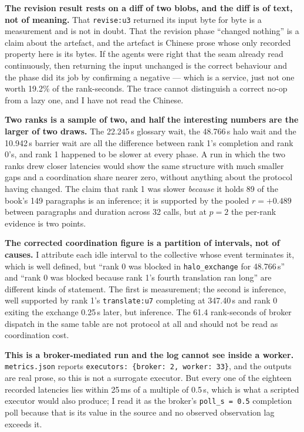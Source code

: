 \documentclass[11pt]{article}
\begin{document}
\textbf{The revision result rests on a diff of two blobs, and the diff is of text, not of
meaning.} That \texttt{revise:u3} returned its input byte for byte is a measurement and is not in
doubt. That the revision phase ``changed nothing'' is a claim about the artefact, and the artefact
is Chinese prose whose only recorded property here is its bytes. If the agents were right that
the seam already read continuously, then returning the input unchanged is the correct behaviour
and the phase did its job by confirming a negative --- which is a service, just not one worth
19.2\% of the rank-seconds. The trace cannot distinguish a correct no-op from a lazy one, and I
have not read the Chinese.

\textbf{Two ranks is a sample of two, and half the interesting numbers are the larger of two
draws.} The 22.245\,s glossary wait, the 48.766\,s halo wait and the 10.942\,s barrier wait are
all the difference between rank 1's completion and rank 0's, and rank 1 happened to be slower at
every phase. A run in which the two ranks drew closer latencies would show the same structure with
much smaller gaps and a coordination share nearer zero, without anything about the protocol having
changed. The claim that rank 1 was slower \emph{because} it holds 89 of the book's 149 paragraphs
is an inference; it is supported by the pooled $r=+0.489$ between paragraphs and duration across
32 calls, but at $p=2$ the per-rank evidence is two points.

\textbf{The corrected coordination figure is a partition of intervals, not of causes.} I attribute
each idle interval to the collective whose event terminates it, which is well defined, but
``rank 0 was blocked in \texttt{halo\_exchange} for 48.766\,s'' and ``rank 0 was blocked because
rank 1's fourth translation ran long'' are different kinds of statement. The first is measurement;
the second is inference, well supported by rank 1's \texttt{translate:u7} completing at 347.40\,s
and rank 0 exiting the exchange 0.25\,s later, but inference. The 61.4 rank-seconds of broker
dispatch in the same table are not protocol at all and should not be read as coordination cost.

\textbf{This is a broker-mediated run and the log cannot see inside a worker.}
\texttt{metrics.json} reports \texttt{executors: \{broker: 2, worker: 33\}}, and the outputs are
real prose, so this is not a surrogate executor. But every one of the eighteen recorded latencies
lies within 25\,ms of a multiple of 0.5\,s, which is what a scripted executor would also produce;
I read it as the broker's \texttt{poll\_s = 0.5} completion poll because that is its value in the
source and no observed observation lag exceeds it.
\end{document}
